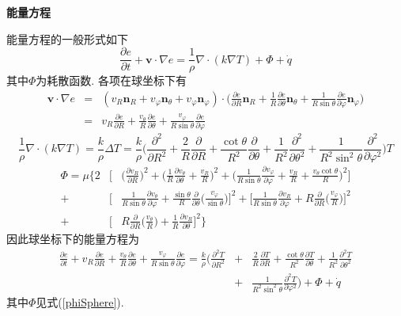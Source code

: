 \begin{solution}
\vspace{5pt}
\noindent\textbf{能量方程}
\vspace{5pt}

\noindent 能量方程的一般形式如下
\[
\frac{\partial e}{\partial t} +\mathbf{v}\cdot\nabla e = \frac{1}{\rho}\nabla\cdot(k\nabla T) + \Phi + \dot{q}
\]
其中$\Phi$为耗散函数. 各项在球坐标下有
{\setlength\arraycolsep{2pt}
\begin{eqnarray}
\mathbf{v}\cdot\nabla e & = & (v_R\mathbf{n}_R + v_\varphi\mathbf{n}_\theta + v_\varphi\mathbf{n}_\varphi)\cdot
\Big(\frac{\partial e}{\partial R}\mathbf{n}_R
+ \frac{1}{R}\frac{\partial e}{\partial\theta}\mathbf{n}_\theta
+ \frac{1}{R\sin\theta}\frac{\partial e}{\partial \varphi}\mathbf{n}_\varphi\Big)\nonumber\\
& = &
v_R\frac{\partial e}{\partial R} +
\frac{v_\theta }{R}\frac{\partial e}{\partial\theta}+
\frac{v_\varphi}{R\sin\theta}\frac{\partial e}{\partial \varphi}\nonumber
\end{eqnarray}}
\[
\frac{1}{\rho}\nabla\cdot(k\nabla T) = \frac{k}{\rho}\Delta T= \frac{k}{\rho}
\Big(
\frac{\partial^2}{\partial R^2} + \frac{2}{R}\frac{\partial}{\partial R}
+ \frac{\cot\theta}{R^2}\frac{\partial}{\partial\theta}+\frac{1}{R^2}\frac{\partial^2}{\partial\theta^2}
+\frac{1}{R^2\sin^2\theta}\frac{\partial^2}{\partial\varphi^2}
\Big)T
\]
{\setlength\arraycolsep{2pt}
\begin{eqnarray}\label{phiSphere}
\Phi  =  \mu
\Big\{
   2& \big[ &
        \big(\frac{\partial v_R}{\partial R}\big)^2
        +\big(\frac{1}{R}\frac{\partial v_\theta}{\partial\theta}+\frac{v_R}{R}\big)^2
        +\big(\frac{1}{R\sin\theta}\frac{\partial v_\varphi}{\partial\varphi}+\frac{v_R}{R}+\frac{v_\theta\cot\theta}{R}\big)^2
    \big]\nonumber\\
+ & \big[ &
        \frac{1}{R\sin\theta}\frac{\partial v_\theta}{\partial\varphi}
        +\frac{\sin\theta}{R}\frac{\partial}{\partial\theta}\big(\frac{v_\varphi}{\sin\theta}\big)
    \big]^2
+  \big[
         \frac{1}{R\sin\theta}\frac{\partial v_R}{\partial\varphi}
        +R\frac{\partial}{\partial R}\big(\frac{v_\varphi}{R}\big)
    \big]^2\nonumber\\
+ & \big[ &
        R\frac{\partial}{\partial R}\big(\frac{v_\theta}{R}\big)
        +\frac{1}{R}\frac{\partial v_R}{\partial\theta}
    \big]^2
\Big\}
\end{eqnarray}}
因此球坐标下的能量方程为
{\setlength\arraycolsep{2pt}
\begin{eqnarray}
\frac{\partial e}{\partial t}
+ v_R\frac{\partial e}{\partial R} +
\frac{v_\theta }{R}\frac{\partial e}{\partial\theta}+
\frac{v_\varphi}{R\sin\theta}\frac{\partial e}{\partial \varphi}
=
\frac{k}{\rho}
\Big(
\frac{\partial^2T}{\partial R^2} &+& \frac{2}{R}\frac{\partial T}{\partial R}
+ \frac{\cot\theta}{R^2}\frac{\partial T}{\partial\theta}+\frac{1}{R^2}\frac{\partial^2T}{\partial\theta^2}\nonumber\\
&+&\frac{1}{R^2\sin^2\theta}\frac{\partial^2T}{\partial\varphi^2}
\Big)
+\Phi
+\dot{q}
\end{eqnarray}}
其中$\Phi$见式(\ref{phiSphere}).
\end{solution} 
